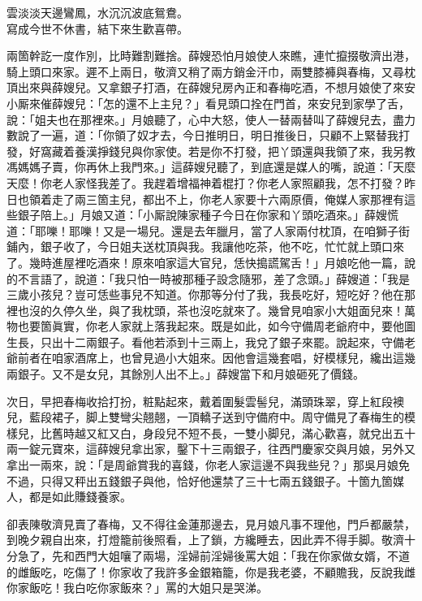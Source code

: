 \begin{myquote}
雲淡淡天邊鸞鳳，水沉沉波底鴛鴦。\\寫成今世不休書，結下來生歡喜帶。
\end{myquote}

兩箇幹訖一度作別，比時難割難捨。{}薛嫂恐怕月娘使人來瞧，連忙攛掇敬濟出港，騎上頭口來家。遲不上兩日，敬濟又稍了兩方銷金汗巾，兩雙膝褲與春梅，又尋枕頂出來與薛嫂兒。又拿銀子打酒，在薛嫂兒房內正和春梅吃酒，不想月娘使了來安小厮來催薛嫂兒：「怎的還不上主兒？」看見頭口拴在門首，來安兒到家學了舌，說：「姐夫也在那裡來。」月娘聽了，心中大怒，使人一替兩替叫了薛嫂兒去，盡力數說了一遍，道：「你領了奴才去，今日推明日，明日推後日，只顧不上緊替我打發，好窩藏着養漢掙錢兒與你家使。若是你不打發，把丫頭還與我領了來，我另教馮媽媽子賣，你再休上我門來。」這薛嫂兒聽了，到底還是媒人的嘴，說道：「天麼天麼！你老人家怪我差了。我趕着增福神着棍打？你老人家照顧我，怎不打發？昨日也領着走了兩三箇主兒，都出不上，你老人家要十六兩原價，俺媒人家那裡有這些銀子陪上。」{}月娘又道：「小厮說陳家種子今日在你家和丫頭吃酒來。」薛嫂慌道：「耶嚛！耶嚛！又是一場兒。還是去年臘月，當了人家兩付枕頂，在咱獅子街鋪內，銀子收了，今日姐夫送枕頂與我。我讓他吃茶，他不吃，忙忙就上頭口來了。幾時進屋裡吃酒來！原來咱家這大官兒，恁快搗謊駕舌！」月娘吃他一篇，說的不言語了，說道：「我只怕一時被那種子設念隨邪，差了念頭。」薛嫂道：「我是三歲小孩兒？豈可恁些事兒不知道。你那等分付了我，我長吃好，短吃好？他在那裡也沒的久停久坐，與了我枕頭，茶也沒吃就來了。幾曾見咱家小大姐面兒來！萬物也要箇眞實，你老人家就上落我起來。既是如此，如今守備周老爺府中，要他圖生長，只出十二兩銀子。看他若添到十三兩上，我兌了銀子來罷。說起來，守備老爺前者在咱家酒席上，也曾見過小大姐來。因他會這幾套唱，好模樣兒，纔出這幾兩銀子。又不是女兒，其餘別人出不上。」薛嫂當下和月娘砸死了價錢。

次日，早把春梅收拾打扮，粧點起來，戴着圍髮雲髻兒，滿頭珠翠，穿上紅段襖兒，藍段裙子，脚上雙彎尖翹翹，一頂轎子送到守備府中。周守備見了春梅生的模樣兒，比舊時越又紅又白，身段兒不短不長，一雙小脚兒，滿心歡喜，{}就兌出五十兩一錠元寶來，這薛嫂兒拿出家，鑿下十三兩銀子，往西門慶家交與月娘，另外又拿出一兩來，說：「是周爺賞我的喜錢，你老人家這邊不與我些兒？」那吳月娘免不過，只得又秤出五錢銀子與他，恰好他還禁了三十七兩五錢銀子。十箇九箇媒人，都是如此賺錢養家。

卻表陳敬濟見賣了春梅，又不得往金蓮那邊去，見月娘凡事不理他，門戶都嚴禁，到晚夕親自出來，打燈籠前後照看，上了鎖，方纔睡去，因此弄不得手脚。敬濟十分急了，先和西門大姐嚷了兩場，{}淫婦前淫婦後罵大姐：「我在你家做女婿，不道的雌飯吃，吃傷了！你家收了我許多金銀箱籠，你是我老婆，不顧贍我，反說我雌你家飯吃！我白吃你家飯來？」罵的大姐只是哭涕。

